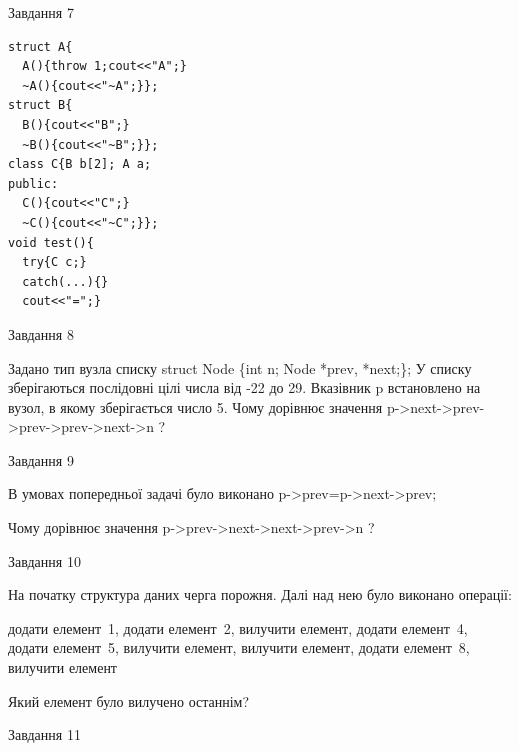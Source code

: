 \documentclass[12pt, ukrainian]{article}
\begin{document}
{{{\begin{minipage}[t]{7cm}
               
{\begin{center}Завдання {7}\end{center}}
\vspace{-6mm}

\begin{verbatim}
struct A{
  A(){throw 1;cout<<"A";}
  ~A(){cout<<"~A";}};
struct B{
  B(){cout<<"B";}
  ~B(){cout<<"~B";}};
class C{B b[2]; A a;
public:
  C(){cout<<"C";}
  ~C(){cout<<"~C";}};
void test(){
  try{C c;} 
  catch(...){} 
  cout<<"=";}
\end{verbatim}            


\end{minipage}
               
{\begin{center}Завдання {8}\end{center}}
\vspace{-6mm}
Задано тип вузла списку
struct Node \{int n; Node *prev, *next;\};
У списку зберігаються послідовні цілі числа від -22 до 29. Вказівник p встановлено на вузол, в якому зберігається число 5.
Чому дорівнює значення p->next->prev->prev->prev->next->n ?\par

               
{\begin{center}Завдання {9}\end{center}}
\vspace{-6mm}
В умовах попередньої задачі було виконано p->prev=p->next->prev;

Чому дорівнює значення p->prev->next->next->prev->n ?\par

\newpage
               
{\begin{center}Завдання {10}\end{center}}
\vspace{-6mm}
На початку структура даних черга порожня. Далі над нею було виконано операції:

додати елемент~1, додати елемент~2, вилучити елемент, додати елемент~4, додати елемент~5, вилучити елемент, вилучити елемент, додати елемент~8, вилучити елемент

Який елемент було вилучено останнім?\par

               
{\begin{center}Завдання {11}\end{center}}
\vspace{-6mm}

}}}
\end{document}
